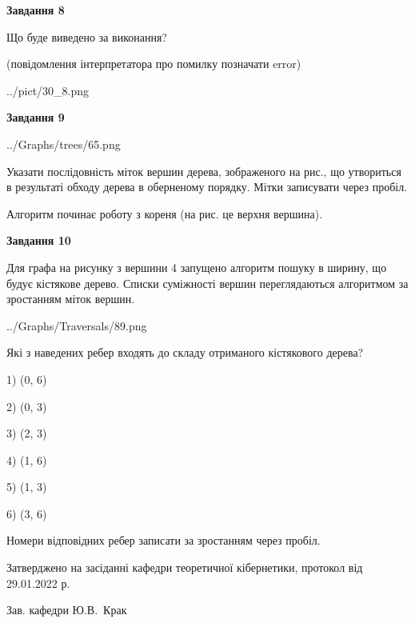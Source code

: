 \documentclass[12pt, ukrainian]{article}
\begin{document}
{\begin {large}
{\begin {center}\textbf{Завдання 8}\end {center}}\par
Що буде виведено за виконання?\par
 (повідомлення інтерпретатора про помилку позначати error)\par
\begin{center}
	{../pict/30_8.png}
\end{center}
\newpage

{\begin {center}\textbf{Завдання 9}\end {center}}\par

\begin{center}
	{../Graphs/trees/65.png}
\end{center}
Указати послідовність міток вершин дерева, зображеного на рис., що утвориться в результаті обходу дерева в оберненому порядку. Мітки записувати через пробіл.\par Алгоритм починає роботу з кореня (на рис. це верхня вершина).\par
\newpage

{\begin {center}\textbf{Завдання 10}\end {center}}\par
Для графа на рисунку з вершини 4 запущено алгоритм пошуку в ширину, що будує кістякове дерево. Списки суміжності вершин переглядаються алгоритмом за зростанням міток вершин.\par
\begin{center}
	{../Graphs/Traversals/89.png}
\end{center}
\par Які з наведених ребер входять до складу отриманого кістякового дерева?\par
1) (0, 6)\par
2) (0, 3)\par
3) (2, 3)\par
4) (1, 6)\par
5) (1, 3)\par
6) (3, 6)\par
{\vskip 15pt} Номери відповідних ребер записати за зростанням через пробіл.\par
\newpage


\end {large}
}
{\smallskip \begin {small} Затверджено на засіданні кафедри теоретичної кібернетики, протокол  від   29.01.2022 р.\par\smallskip\smallskip
{\parbox {6.5 cm}{Зав. кафедри \dotfill Ю.В.~Крак}} \end{small}}
\end{document}
